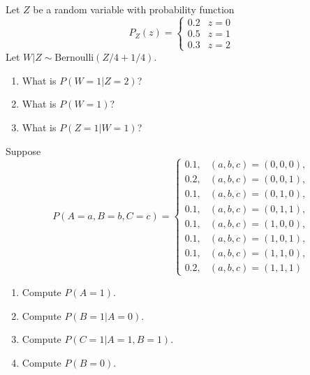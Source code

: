 \begin{exercise}
Let $Z$ be a random variable with probability function
\begin{equation*}
P_Z(z) = \begin{cases}
  0.2 & z=0 \\
  0.5 & z=1 \\
  0.3 & z=2
\end{cases}
\end{equation*}
Let $W|Z \sim \text{Bernoulli}(Z/4 + 1/4)$.
\begin{enumerate}[label=(\alph*)]
\item What is $P(W=1|Z=2)$?
\item What is $P(W=1)$?
\item What is $P(Z=1|W=1)$?
\end{enumerate}
\end{exercise}

\begin{exercise}
Suppose 
\begin{equation*}
P(A=a,B=b,C=c) = \begin{cases}
0.1, & (a,b,c)=(0,0,0),\\
0.2, & (a,b,c)=(0,0,1),\\
0.1, & (a,b,c)=(0,1,0),\\
0.1, & (a,b,c)=(0,1,1),\\
0.1, & (a,b,c)=(1,0,0),\\
0.1, & (a,b,c)=(1,0,1),\\
0.1, & (a,b,c)=(1,1,0),\\
0.2, & (a,b,c)=(1,1,1)
\end{cases}
\end{equation*}
\begin{enumerate}[label=(\alph*)]
\item Compute $P(A=1)$.
\item Compute $P(B=1|A=0)$.
\item Compute $P(C=1|A=1, B=1)$.
\item Compute $P(B=0)$.
\end{enumerate}
\end{exercise}




